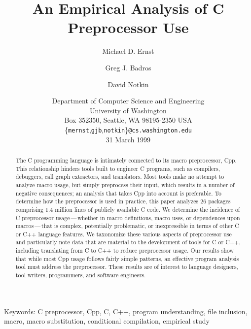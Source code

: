 \documentclass[10pt]{article}
\def\numpackages{26}
\def\numlinesalmost{1.4 million}
\begin{document}
% 


\title{An Empirical Analysis of C Preprocessor Use}

\author{Michael D. Ernst \and Greg J. Badros \and David Notkin}

\date{%
Department of Computer Science and Engineering \\
University of Washington \\
Box 352350, Seattle, WA  98195-2350  USA \\
{\small \{{\tt mernst},{\tt gjb},{\tt notkin}\}{\tt @cs.washington.edu}} \\
31 March 1999}  

\maketitle

\begin{abstract}
  The C programming language is intimately connected to its macro
  preprocessor, Cpp.  This relationship hinders tools built to
  engineer C programs, such as compilers, debuggers, call graph
  extractors, and translators.  Most tools make no attempt to analyze
  macro usage, but simply preprocess their input, which results in a
  number of negative consequences; an analysis that takes Cpp into
  account is preferable.  To determine how the preprocessor is used in
  practice, this paper analyzes {\numpackages} packages comprising
  {\numlinesalmost} lines of publicly available C code.  We determine
  the incidence of C preprocessor usage\,---\,whether in macro
  definitions, macro uses, or dependences upon macros\,---\,that is
  complex, potentially problematic, or inexpressible in terms of other
  C or C++ language features.  We taxonomize these various aspects of
  preprocessor use and particularly note data that are material to the
  development of tools for C or C++, including translating from C to
  C++ to reduce preprocessor usage.  Our results show that while most
  Cpp usage follows fairly simple patterns, an effective program
  analysis tool must address the preprocessor.  These results are of
  interest to language designers, tool writers, programmers, and
  software engineers.
\end{abstract}

\noindent
Keywords: C preprocessor, Cpp, C, C++, program understanding, file
inclusion, macro, macro substitution, conditional compilation, empirical study
\end{document}
